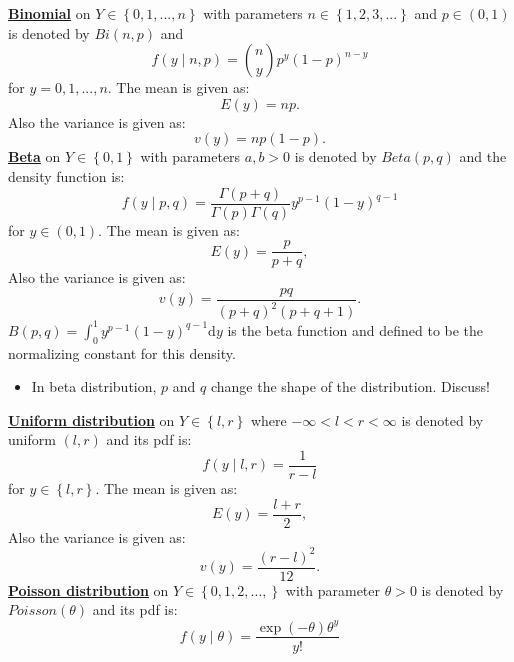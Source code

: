 \documentclass[lecture,12pt,]{pcms-l}
\numberwithin{section}{chapter}
\numberwithin{equation}{chapter}
\theoremstyle{plain}
\theoremstyle{definition}
\theoremstyle{definition}
\begin{document}
\underline{\bf{Binomial}} on $Y \in \left \{0,1,...,n  \right \}$ with parameters $n \in \left \{1,2,3,... \right \}$ and $p \in (0,1)$ is denoted by $Bi(n,p)$ and 
\begin{equation}
f(y \mid n, p)=\binom{n}{y}p^y (1-p)^{n-y}
\end{equation}
for $y=0,1,...,n$. The mean is given as:
\begin{equation}
E(y)=np.
\end{equation}
Also the variance is given as:
\begin{equation}
v(y)=np(1-p).
\end{equation}
\underline{\bf{Beta}} on  $Y \in \left \{0,1 \right \}$ with parameters $a,b>0$ is denoted by $Beta(p,q)$ and the density function is:
\begin{equation}
f(y \mid p,q)= \frac{\Gamma(p+q)}{\Gamma(p)\Gamma(q)}y^{p-1}(1-y)^{q-1}
\end{equation}
for $y \in (0,1)$. The mean is given as:
\begin{equation}
E(y)=\frac{p}{p+q},
\end{equation}
Also the variance is given as:
\begin{equation}
v(y)=\frac{pq}{(p+q)^2(p+q+1)}.
\end{equation}
$B(p,q)=\int_{0}^1 y^{p-1}(1-y)^{q-1}\mathrm{d}y$ is the beta function and defined to be the normalizing constant for this density.
\begin{itemize}
\item In beta distribution, $p$ and $q$ change the shape of the distribution. Discuss!
\end{itemize}
\underline{\bf{Uniform distribution}} on $Y \in \left \{l,r \right \}$ where $-\infty<l<r<\infty$ is denoted by uniform $(l,r)$ and its pdf is:
\begin{equation}
f(y\mid l,r)=\frac{1}{r-l}
\end{equation}
for $y \in \left \{l,r \right \}$. The mean is given as:
\begin{equation}
E(y)=\frac{l+r}{2},
\end{equation}
Also the variance is given as:
\begin{equation}
v(y)=\frac{(r-l)^2}{12}.
\end{equation}
\underline{\bf{Poisson distribution}} on $Y \in \left \{0,1,2,..., \right \}$ with parameter $\theta>0$ is denoted by $Poisson(\theta)$ and its pdf is:
\begin{equation}
f(y \mid \theta)=\frac{\exp(-\theta)\theta^y}{y!}
\end{equation}
\end{document}

